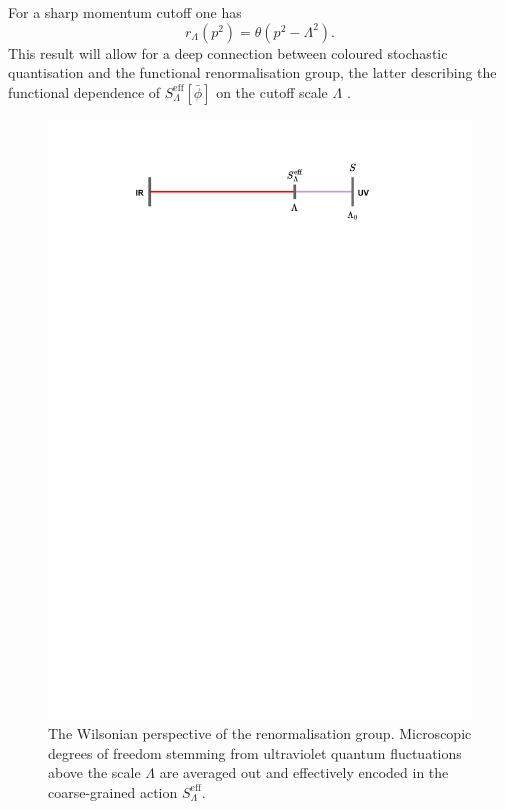 For a sharp momentum cutoff one has
\begin{equation*}
    r_{\Lambda}(p^2) = \theta\left(p^2-\Lambda^2\right).
\end{equation*}
This result will allow for a deep connection between coloured stochastic quantisation and the functional renormalisation group, the latter describing the functional dependence of $S_\Lambda^\text{eff}[\bar\phi]$ on the cutoff scale $\Lambda$ \cite{frgrev1,frgrev2,frgrev3,frgrev4,frgrev4,frgrev5}.
\begin{figure}
    \centering
    \includegraphics[scale=0.7]{figures/wilson.pdf}
    \caption[The Wilsonian renormalisation group]{The Wilsonian perspective of the renormalisation group. Microscopic degrees of freedom stemming from ultraviolet quantum fluctuations above the scale $\Lambda$ are averaged out and effectively encoded in the coarse-grained action $S_{\Lambda}^{\text{eff}}$.}
    \label{fig:wilson}
\end{figure}
\newpage
